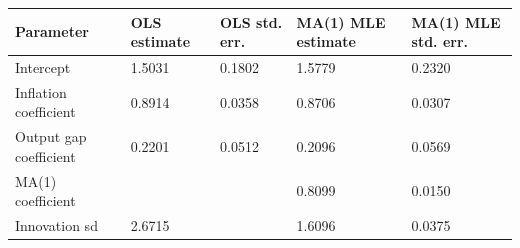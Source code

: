 \begin{tabular}{lllll}
\toprule
Parameter & OLS estimate & OLS std. err. & MA(1) MLE estimate & MA(1) MLE std. err. \\
\midrule
Intercept & 1.5031 & 0.1802 & 1.5779 & 0.2320 \\
Inflation coefficient & 0.8914 & 0.0358 & 0.8706 & 0.0307 \\
Output gap coefficient & 0.2201 & 0.0512 & 0.2096 & 0.0569 \\
MA(1) coefficient &  &  & 0.8099 & 0.0150 \\
Innovation sd & 2.6715 &  & 1.6096 & 0.0375 \\
\bottomrule
\end{tabular}
